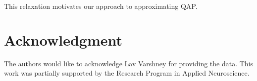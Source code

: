 \documentclass[preprint,11pt]{elsarticle}
\begin{document}
This relaxation motivates our approach to approximating QAP.

	



\section*{Acknowledgment}
% 
The authors would like to acknowledge 
Lav Varshney for providing the data. This work was partially supported by the Research Program in Applied Neuroscience. 
% 
% 


% 

\end{document}
